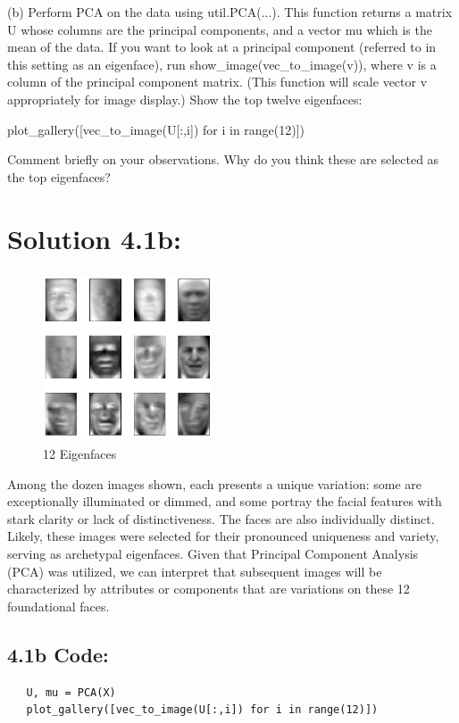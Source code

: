 \documentclass[10pt]{article}
\begin{document}
(b) Perform PCA on the data using util.PCA(...). This function returns a matrix U whose columns are the principal components, and a vector mu which is the mean of the data. If you want to look at a principal component (referred to in this setting as an eigenface), run show\_image(vec\_to\_image(v)), where $\mathrm{v}$ is a column of the principal component matrix. (This function will scale vector $\mathrm{v}$ appropriately for image display.) Show the top twelve eigenfaces:

plot\_gallery([vec\_to\_image(U[:,i]) for i in range(12)])

Comment briefly on your observations. Why do you think these are selected as the top eigenfaces?

\section*{Solution 4.1b:}

\begin{figure}[H]
  \centering
  \includegraphics[width=5cm, height=5cm]{images/4.1b_eigen_faces.png}
  \caption{12 Eigenfaces}
  \label{fig:eigenfaces}
\end{figure}

Among the dozen images shown, each presents a unique variation: some are exceptionally illuminated or dimmed, and some portray the facial features with stark clarity or 
 lack of distinctiveness. The faces are also individually distinct. Likely, these images were selected for their pronounced uniqueness and variety, serving as archetypal eigenfaces. Given that Principal Component Analysis (PCA) was utilized, we can interpret that subsequent images will be characterized by attributes or components that are variations on these 12 foundational faces. \\

\subsection*{4.1b Code:}
\begin{verbatim}
   U, mu = PCA(X)
   plot_gallery([vec_to_image(U[:,i]) for i in range(12)])
\end{verbatim} 
\end{document}

